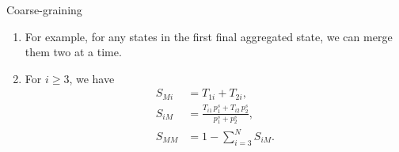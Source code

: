 \documentclass[12pt]{article}
\begin{document}
\begin{problem}{Coarse-graining}
\begin{enumerate}
  \item
    For example, for any states in the first final aggregated state, we can merge them two at a time.

  \item
    For $i \ge 3$, we have
    \begin{align}
      S_{Mi} &= T_{1i} + T_{2i},
      \label{eq:csrule_Mi} \\
      S_{iM} &= \frac{ T_{i1} \, p^s_1 + T_{i2} \, p^s_2 } { p^s_1 + p^s_2 },
      \label{eq:csrule_iM} \\
      S_{MM} &= 1 - \sum_{i = 3}^N S_{iM}.
      \label{eq:csrule_MM}
    \end{align}


\end{enumerate}
\end{problem}
\end{document}
